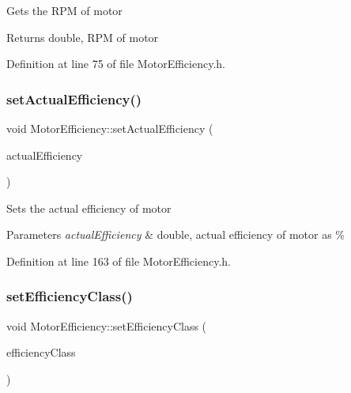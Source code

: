 Gets the R\+PM of motor \begin{DoxyReturn}{Returns}
double, R\+PM of motor 
\end{DoxyReturn}


Definition at line 75 of file Motor\+Efficiency.\+h.

\mbox{\label{class_motor_efficiency_a7a5ad8d01fdc0a3bf93d952752487496}} 
\subsubsection{\texorpdfstring{set\+Actual\+Efficiency()}{setActualEfficiency()}}
{\footnotesize\ttfamily void Motor\+Efficiency\+::set\+Actual\+Efficiency (\begin{DoxyParamCaption}\item[{double}]{actual\+Efficiency }\end{DoxyParamCaption})\hspace{0.3cm}{\ttfamily [inline]}}

Sets the actual efficiency of motor 
\begin{DoxyParams}{Parameters}
{\em actual\+Efficiency} & double, actual efficiency of motor as \% \\
\hline
\end{DoxyParams}


Definition at line 163 of file Motor\+Efficiency.\+h.

\mbox{\label{class_motor_efficiency_a1ff4790d01bf2e65bd7bce2edc98d0c5}} 
\subsubsection{\texorpdfstring{set\+Efficiency\+Class()}{setEfficiencyClass()}}
{\footnotesize\ttfamily void Motor\+Efficiency\+::set\+Efficiency\+Class (\begin{DoxyParamCaption}\item[{Motor\+::\+Efficiency\+Class}]{efficiency\+Class }\end{DoxyParamCaption})\hspace{0.3cm}{\ttfamily [inline]}}

